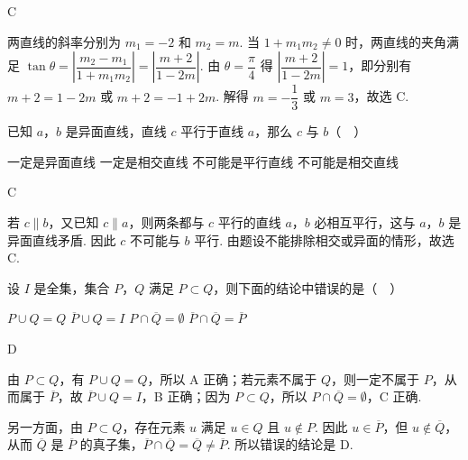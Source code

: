 \begin{answer}
C
\end{answer}

\begin{solution}
两直线的斜率分别为 \(m_1=-2\) 和 \(m_2=m\). 当 \(1+m_1m_2\ne0\) 时，两直线的夹角满足
\(\tan\theta=\left|\dfrac{m_2-m_1}{1+m_1m_2}\right|=\left|\dfrac{m+2}{1-2m}\right|\). 由 \(\theta=\dfrac\pi4\) 得
\(\left|\dfrac{m+2}{1-2m}\right|=1\)，即分别有
\(m+2=1-2m\) 或 \(m+2=-1+2m\). 解得 \(m=-\dfrac13\) 或 \(m=3\)，故选 C.
\end{solution}

\begin{problem}
已知 \(a\)，\(b\) 是异面直线，直线 \(c\) 平行于直线 \(a\)，那么 \(c\) 与 \(b\)（\(\quad\)）

\choices
    {一定是异面直线}
    {一定是相交直线}
    {不可能是平行直线}
    {不可能是相交直线}
\end{problem}

\begin{answer}
C
\end{answer}

\begin{solution}
若 \(c\parallel b\)，又已知 \(c\parallel a\)，则两条都与 \(c\) 平行的直线 \(a\)，\(b\) 必相互平行，这与 \(a\)，\(b\) 是异面直线矛盾. 因此 \(c\) 不可能与 \(b\) 平行. 由题设不能排除相交或异面的情形，故选 C.
\end{solution}

\begin{problem}
设 \(I\) 是全集，集合 \(P\)，\(Q\) 满足 \(P \subset Q\)，则下面的结论中错误的是（\(\quad\)）

\choices
    {\(P \cup Q = Q\)}
    {\(\overline{P} \cup Q = I\)}
    {\(P \cap \overline{Q} = \emptyset\)}
    {\(\overline{P} \cap \overline{Q} = \overline{P}\)}
\end{problem}

\begin{answer}
D
\end{answer}

\begin{solution}
由 \(P\subset Q\)，有 \(P\cup Q=Q\)，所以 A 正确；若元素不属于 \(Q\)，则一定不属于 \(P\)，从而属于 \(\overline P\)，故 \(\overline P\cup Q=I\)，B 正确；因为 \(P\subset Q\)，所以 \(P\cap\overline Q=\emptyset\)，C 正确.

另一方面，由 \(P\subset Q\)，存在元素 \(u\) 满足 \(u\in Q\) 且 \(u\notin P\). 因此 \(u\in\overline P\)，但 \(u\notin\overline Q\)，从而 \(\overline Q\) 是 \(\overline P\) 的真子集，\(\overline P\cap\overline Q=\overline Q\ne\overline P\). 所以错误的结论是 D.
\end{solution}


